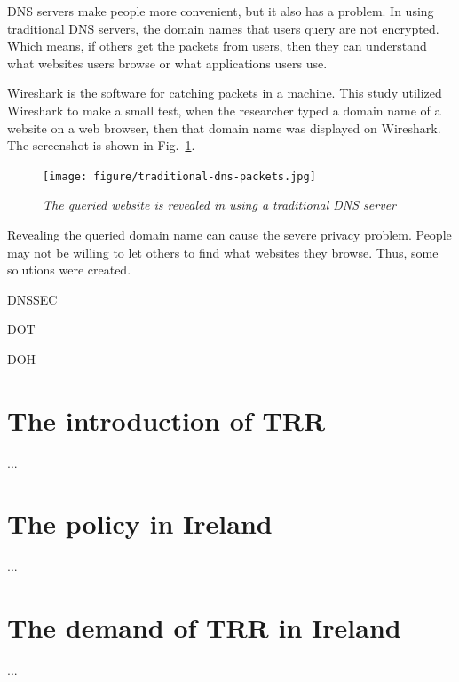 	DNS servers make people more convenient, but it also has a problem. In using traditional DNS servers, the domain names that users query are not encrypted. Which means, if others get the packets from users, then they can understand what websites users browse or what applications users use.
	
	Wireshark is the software for catching packets in a machine. This study utilized Wireshark to make a small test, when the researcher typed a domain name of a website on a web browser, then that domain name was displayed on Wireshark. The screenshot is shown in Fig.~\ref{fig:traditional_dns_packets}.
	
	\begin{figure}[h]  
    \centering
    \texttt{[image: figure/traditional-dns-packets.jpg]}
    \caption{\em The queried website is revealed in using a traditional DNS server}
    \label{fig:traditional_dns_packets}
    \end{figure}
    
    Revealing the queried domain name can cause the severe privacy problem. People may not be willing to let others to find what websites they browse. Thus, some solutions were created.
    
    DNSSEC
    
    DOT
    
    DOH
	
	\section{The introduction of TRR}
	
	...
	
	\section{The policy in Ireland}

    ...

    \section{The demand of TRR in Ireland}
    
    ...
